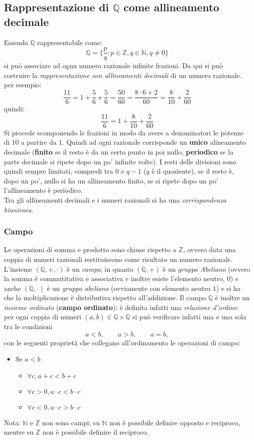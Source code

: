 \documentclass[a4paper,12pt, oneside]{book}
\begin{document}
\subsection{Rappresentazione di $\mathbb{Q}$ come allineamento decimale}
Essendo $\mathbb{Q}$ rappresentabile come:
$$\mathbb{Q} = \{\frac{p}{q} : p\in\mathbb{Z}, q\in\mathbb{N}, q \neq 0 \}$$ si può associare ad ognu numero razionale infinite frazioni. Da qui si può costruire la \textit{rappresentazione con allineamenti decimali} di un numero razionale. per esempio:
$$\frac{11}{6}=1+\frac{5}{6} \mbox{ e } \frac{5}{6}=\frac{50}{60}=\frac{8\cdot 6+2}{60}=\frac{8}{10}+\frac{2}{60}$$
quindi: $$\frac{11}{6}=1+\frac{8}{10}+\frac{2}{60}$$
Si procede scomponendo le frazioni in modo da avere a denominatori le potenze di $10$ a partire da $1$. Quindi ad ogni razionale corrisponde un \textbf{unico} alineamento decimale (\textbf{finito} se il resto è da un certo punto in poi nullo, \textbf{periodico} se la parte decimale si ripete dopo un po' infinite volte). I resti delle divisioni sono quindi sempre limitati, compredi tra $0$ e $q-1$ ($q$ è il quoziente), se il resto è, dopo un po', nullo si ha un allineamento finito, se si ripete dopo un po' l'allineamento è periodico.\\Tra gli allineamenti decimali e i numeri razionali si ha una \textit{corrispondenza biunivoca}.
\subsubsection{Campo}
Le operazioni di somma e prodotto sono chiuse rispetto a  $\mathbb{Z}$, ovvero data una coppia di numeri razionali restituiscono come risultato un numero razionale.\\
L'insieme $(\mathbb{Q},+,\cdot)$ è un \textit{campo}, in quanto $(\mathbb{Q},+)$ è un \textit{gruppo Abeliano} (ovvero la somma è commutitativa e associativa e inoltre esiste l'elemento neutro, $0$) e anche $(\mathbb{Q},\cdot)$ è un \textit{gruppo abeliano} (ovviamente con elemento neutro $1$) e si ha che la moltiplicazione è distributiva rispetto all'addizione.
Il campo $\mathbb{Q}$ è inoltre un \textit{insieme ordinato} (\textbf{campo ordinato}): è definita infatti una \textit{relazione d'ordine}: per ogni coppia di numeri $(a,b)\in\mathbb{Q}\times\mathbb{Q}$ si può verificare infatti una e una sola tra le condizioni
$$a<b,\qquad a>b,\qquad a=b,$$
con le seguenti proprietà che collegano all'ordinamento le operazioni di campo:
\begin{itemize}
	\item Se $a<b$
	\begin{itemize}
		\item $\forall c, a+c<b+c$
		\item $\forall c>0, a\cdot c<b\cdot c$
		\item $\forall c<0, a\cdot c>b\cdot c$
	\end{itemize}
\end{itemize}
Nota: $\mathbb{N}$ e $\mathbb{Z}$ non sono campi; su $\mathbb{N}$ non è possibile definire opposto e reciproco, mentre su $\mathbb{Z}$ non è possibile definire il reciproco.
\end{document}
